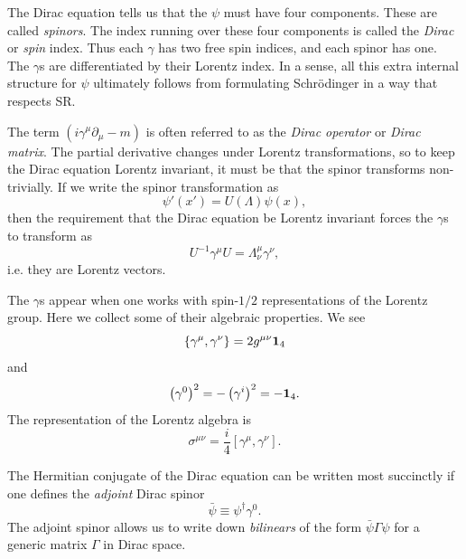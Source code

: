 The Dirac equation tells us that the $\psi$ must have four components. These are
called {\it spinors}. The index running over these four components
is called the {\it Dirac} or {\it spin}
index. Thus each $\gamma$ has two free spin
indices, and each spinor has one. The $\gamma$s are differentiated by their
Lorentz index. In a sense, all this extra internal structure for $\psi$
ultimately follows from formulating Schr\"odinger in a way that respects SR.

The term $(i\gamma^\mu\partial_\mu-m)$ is often referred to as the {\it Dirac
operator} or {\it Dirac matrix}. The partial derivative
changes under Lorentz transformations, so to keep the Dirac equation Lorentz
invariant, it must be that the spinor transforms non-trivially.
If we write the spinor transformation as
\begin{equation}
\psi'(x')=U(\Lambda)\psi(x),
\end{equation}
then the requirement that the Dirac equation be Lorentz invariant forces
the $\gamma$s to transform as
\begin{equation}\label{eq:gammaLorentz}
U^{-1}\gamma^\mu U=\Lambda^\mu_\nu\gamma^\nu,
\end{equation}
i.e. they are Lorentz vectors. 

The $\gamma$s appear when one works with spin-$1/2$ representations of
the Lorentz group. Here we collect some of their algebraic properties.
We see 
\begin{equation}
  \left\{\gamma^\mu,\gamma^\nu\right\}=2g^{\mu\nu}{\mathbf 1}_4
\end{equation}
and
\begin{equation}
\left(\gamma^0\right)^2=-\left(\gamma^i\right)^2=-{\mathbf 1}_4.
\end{equation}
The representation of the Lorentz algebra is
\begin{equation}
  \sigma^{\mu\nu}=\frac{i}{4}\left[\gamma^\mu,\gamma^\nu\right].
\end{equation}

The Hermitian conjugate of the Dirac equation can be written
most succinctly if one defines the {\it adjoint} Dirac 
spinor 
\begin{equation}
  \bar{\psi}\equiv\psi^\dagger\gamma^0.
\end{equation}
The adjoint spinor allows us to write down {\it bilinears}
of the form $\bar{\psi}\Gamma\psi$ for a generic matrix $\Gamma$ in Dirac space. 

